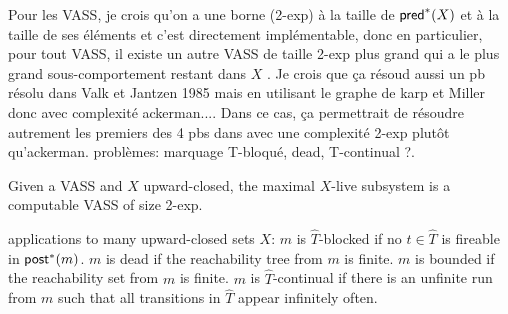 Pour les VASS, je crois qu'on a une borne (2-exp) à la taille de $\textsf{pred}^*(X)$ et à la taille de ses éléments \cite{DBLP:conf/rp/BozzelliG11} et c'est directement implémentable, donc en particulier, pour tout VASS, il existe un autre VASS de taille 2-exp plus grand qui a le plus grand sous-comportement restant dans $X$ .
Je crois que ça résoud aussi un pb résolu dans Valk et Jantzen 1985 \cite{DBLP:journals/acta/ValkJ85} mais en utilisant le graphe de karp et Miller donc avec complexité ackerman.... Dans ce cas, ça permettrait de résoudre autrement les premiers des 4 pbs dans \cite{DBLP:journals/acta/ValkJ85} avec une complexité 2-exp plutôt qu'ackerman. problèmes: marquage T-bloqué, dead, T-continual ?.

\begin{theorem}{}
Given a VASS and $X$ upward-closed, the maximal $X$-live subsystem is a computable VASS of size 2-exp.
\end{theorem}

applications to many upward-closed sets $X$:
$m$ is $\hat{T}$-blocked if no $t \in \hat{T}$ is fireable in $\textsf{post}^*(m)$.
$m$ is dead if the reachability tree from $m$ is finite.
$m$ is bounded if the reachability set from $m$ is finite.
$m$ is $\hat{T}$-continual if there is an unfinite run from $m$ such that all transitions in $\hat{T}$ appear infinitely often.


